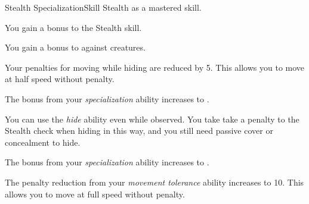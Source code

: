     \begin{feat}{Stealth Specialization}{Skill}
        \featpre Stealth as a mastered skill.

         You gain a  bonus to the Stealth skill.

         You gain a  bonus to  against  creatures.

         Your penalties for moving while hiding are reduced by 5.
        This allows you to move at half speed without penalty.

         The bonus from your \textit{specialization} ability increases to .

         You can use the \textit{hide} ability even while observed.
        You take take a  penalty to the Stealth check when hiding in this way, and you still need passive cover or concealment to hide.

         The bonus from your \textit{specialization} ability increases to .

         The penalty reduction from your \textit{movement tolerance} ability increases to 10.
        This allows you to move at full speed without penalty.
    \end{feat}

